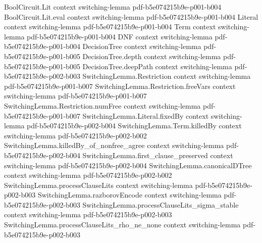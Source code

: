 \begin{lemma}
\label{SwitchingLemma.find_clause_preserved_in_encode}
\leanok
{}
\proofstep
  {BoolCircuit.Lit}
  {context}
  {switching-lemma}
  {pdf-b5e074215b9e-p001-b004}
\proofstep
  {BoolCircuit.Lit.eval}
  {context}
  {switching-lemma}
  {pdf-b5e074215b9e-p001-b004}
\proofstep
  {Literal}
  {context}
  {switching-lemma}
  {pdf-b5e074215b9e-p001-b004}
\proofstep
  {Term}
  {context}
  {switching-lemma}
  {pdf-b5e074215b9e-p001-b004}
\proofstep
  {DNF}
  {context}
  {switching-lemma}
  {pdf-b5e074215b9e-p001-b004}
\proofstep
  {DecisionTree}
  {context}
  {switching-lemma}
  {pdf-b5e074215b9e-p001-b005}
\proofstep
  {DecisionTree.depth}
  {context}
  {switching-lemma}
  {pdf-b5e074215b9e-p001-b005}
\proofstep
  {DecisionTree.deepPath}
  {context}
  {switching-lemma}
  {pdf-b5e074215b9e-p002-b003}
\proofstep
  {SwitchingLemma.Restriction}
  {context}
  {switching-lemma}
  {pdf-b5e074215b9e-p001-b007}
\proofstep
  {SwitchingLemma.Restriction.freeVars}
  {context}
  {switching-lemma}
  {pdf-b5e074215b9e-p001-b007}
\proofstep
  {SwitchingLemma.Restriction.numFree}
  {context}
  {switching-lemma}
  {pdf-b5e074215b9e-p001-b007}
\proofstep
  {SwitchingLemma.Literal.fixedBy}
  {context}
  {switching-lemma}
  {pdf-b5e074215b9e-p002-b004}
\proofstep
  {SwitchingLemma.Term.killedBy}
  {context}
  {switching-lemma}
  {pdf-b5e074215b9e-p002-b002}
\proofstep
  {SwitchingLemma.killedBy_of_nonfree_agree}
  {context}
  {switching-lemma}
  {pdf-b5e074215b9e-p002-b004}
\proofstep
  {SwitchingLemma.first_clause_preserved}
  {context}
  {switching-lemma}
  {pdf-b5e074215b9e-p002-b004}
\proofstep
  {SwitchingLemma.canonicalDTree}
  {context}
  {switching-lemma}
  {pdf-b5e074215b9e-p002-b002}
\proofstep
  {SwitchingLemma.processClauseLits}
  {context}
  {switching-lemma}
  {pdf-b5e074215b9e-p002-b003}
\proofstep
  {SwitchingLemma.razborovEncode}
  {context}
  {switching-lemma}
  {pdf-b5e074215b9e-p002-b003}
\proofstep
  {SwitchingLemma.processClauseLits_sigma_stable}
  {context}
  {switching-lemma}
  {pdf-b5e074215b9e-p002-b003}
\proofstep
  {SwitchingLemma.processClauseLits_rho_ne_none}
  {context}
  {switching-lemma}
  {pdf-b5e074215b9e-p002-b003}

\end{lemma}
